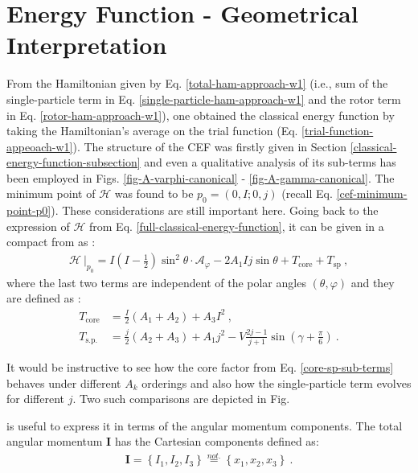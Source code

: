 \section{Energy Function - Geometrical Interpretation}

From the Hamiltonian given by Eq. \ref{total-ham-approach-w1} (i.e., sum of the single-particle term in Eq. \ref{single-particle-ham-approach-w1} and the rotor term in Eq. \ref{rotor-ham-approach-w1}), one obtained the classical energy function by taking the Hamiltonian's average on the trial function (Eq. \ref{trial-function-appeoach-w1}). The structure of the CEF was firstly given in Section \ref{classical-energy-function-subsection} and even a qualitative analysis of its sub-terms has been employed in Figs. \ref{fig-A-varphi-canonical} - \ref{fig-A-gamma-canonical}. The minimum point of $\mathcal{H}$ was found to be $p_0=(0,I;0,j)$ (recall Eq. \ref{cef-minimum-point-p0}). These considerations are still important here. Going back to the expression of $\mathcal{H}$ from Eq. \ref{full-classical-energy-function}, it can be given in a compact from as \cite{poenaru2021extensive2}:
\begin{align}
    \left. \mathcal{H}\ \right\vert_{p_0}=I\left(I-\frac{1}{2}\right)\sin^2\theta\cdot \mathcal{A}_\varphi-2A_1Ij\sin\theta+T_\text{core}+T_\text{sp}\ ,
\end{align}
where the last two terms are independent of the polar angles $(\theta,\varphi)$ and they are defined as \cite{poenaru2021extensive2}:
\begin{align}
    T_\text{core}&=\frac{I}{2}(A_1+A_2)+A_3I^2\ ,\\
    T_\text{s.p.}&=\frac{j}{2}(A_2+A_3)+A_1j^2-V\frac{2j-1}{j+1}\sin\left(\gamma+\frac{\pi}{6}\right)\ .
    \label{core-sp-sub-terms}
\end{align}

It would be instructive to see how the core factor from Eq. \ref{core-sp-sub-terms} behaves under different $A_k$ orderings and also how the single-particle term evolves for different $j$. Two such comparisons are depicted in Fig. 

is useful to express it in terms of the angular momentum components. The total angular momentum $\mathbf{I}$ has the Cartesian components defined as:
\begin{align}
    \mathbf{I}=\left\{I_1,I_2,I_3\right\}\stackrel{not.}{=}\left\{x_1,x_2,x_3\right\}\ .
\end{align} 
